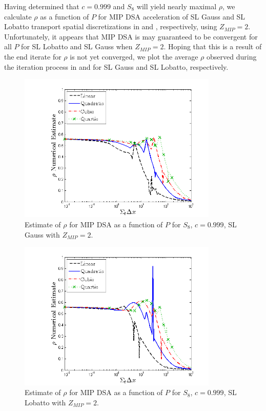 Having determined that $c=0.999$ and $S_8$ will yield nearly maximal $\rho$, we calculate $\rho$ as a function of $P$ for MIP DSA acceleration of SL Gauss and SL Lobatto transport spatial discretizations in  and , respectively, using $Z_{MIP}=2$.  
Unfortunately, it appears that MIP DSA is may guaranteed to be convergent for all $P$ for SL Lobatto and SL Gauss when $Z_{MIP}=2$.  
Hoping that this is a result of the end iterate for $\rho$ is not yet converged, we plot the average $\rho$ observed during the iteration process in  and  for SL Gauss and SL Lobatto, respectively.  

\newpage

\begin{figure}[!htp]
\centering
\includegraphics[width=9.5cm]{chapter4_acceleration/Const_2_Constant_XS_SN8_MIP_Gauss.png}
\caption{Estimate of $\rho$ for MIP DSA as a function of $P$ for  $S_8$, $c=0.999$, SL Gauss with $Z_{MIP}=2$.}
\label{fig:mip_gauss}
\end{figure}
%
\begin{figure}[!hbp]
\centering
\includegraphics[width=9.5cm]{chapter4_acceleration/Const_2_Constant_XS_SN8_MIP_Lobatto.png}
\caption{Estimate of $\rho$ for MIP DSA as a function of $P$ for $S_8$, $c=0.999$,  SL Lobatto with $Z_{MIP}=2$.}
\label{fig:mip_lobatto}
\end{figure}

